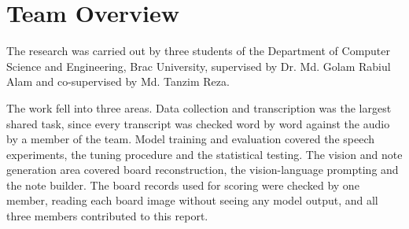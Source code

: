 \section{Team Overview}

The research was carried out by three students of the Department of Computer Science and
Engineering, Brac University, supervised by Dr. Md. Golam Rabiul Alam and co-supervised
by Md. Tanzim Reza.

The work fell into three areas. Data collection and transcription was the largest
shared task, since every transcript was checked word by word against the audio by a member
of the team. Model training and evaluation covered the speech experiments, the tuning
procedure and the statistical testing. The vision and note generation area covered board
reconstruction, the vision-language prompting and the note builder. The board records used
for scoring were checked by one member, reading each board image without seeing any model
output, and all three members contributed to this report.
